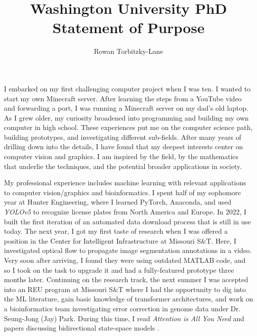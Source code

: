 \documentclass[12pt]{article}
\title{Washington University PhD Statement of Purpose}
\author{Rowan Torbitzky-Lane}
\date{}
\begin{document}
\maketitle

I embarked on my first challenging computer project when I was ten. I wanted to start my own Minecraft server. After learning the steps from a YouTube video and forwarding a port, I was running a Minecraft server on my dad's old laptop. As I grew older, my curiosity broadened into programming and building my own computer in high school. These experiences put me on the computer science path, building prototypes, and investigating different sub-fields. After many years of drilling down into the details, I have found that my deepest interests center on computer vision and graphics. I am inspired by the field, by the mathematics that underlie the techniques, and the potential broader applications in society.

My professional experience includes machine learning with relevant applications to computer vision/graphics and bioinformatics. I spent half of my sophomore year at Hunter Engineering, where I learned PyTorch, Anaconda, and used \textit{YOLOv5} \cite{terven2023yolo} to recognize license plates from North America and Europe. In 2022, I built the first iteration of an automated data download process that is still in use today. The next year, I got my first taste of research when I was offered a position in the Center for Intelligent Infrastructure at Missouri S\&T. Here, I investigated optical flow to propagate image segmentation annotations in a video. Very soon after arriving, I found they were using outdated MATLAB code, and so I took on the task to upgrade it and had a fully-featured prototype three months later. Continuing on the research track, the next summer I was accepted into an REU program at Missouri S\&T where I had the opportunity to dig into the ML literature, gain basic knowledge of transformer architectures, and work on a bioinformatics team investigating error correction in genome data under Dr. Seung-Jong (Jay) Park. During this time, I read \textit{Attention is All You Need} \cite{vaswani2017attention} and papers discussing bidirectional state-space models \cite{schiff2024caduceus}. 
\end{document}
